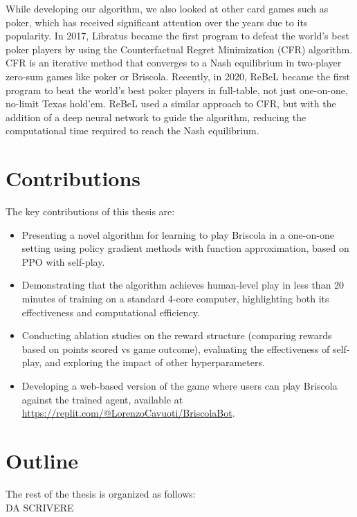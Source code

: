 While developing our algorithm, we also looked at other card games such as poker, which has received significant attention over the years due to its popularity. In 2017, Libratus \cite{libratus} became the first program to defeat the world's best poker players by using the Counterfactual Regret Minimization (CFR) \cite{cfr} algorithm. CFR is an iterative method that converges to a Nash equilibrium in two-player zero-sum games like poker or Briscola. Recently, in 2020, ReBeL \cite{rebel} became the first program to beat the world's best poker players in full-table, not just one-on-one, no-limit Texas hold'em. ReBeL used a similar approach to CFR, but with the addition of a deep neural network to guide the algorithm, reducing the computational time required to reach the Nash equilibrium.

\section{Contributions}
The key contributions of this thesis are:
\begin{itemize}
    \item Presenting a novel algorithm for learning to play Briscola in a one-on-one setting using policy gradient methods with function approximation, based on PPO with self-play.
    \item Demonstrating that the algorithm achieves human-level play in less than 20 minutes of training on a standard 4-core computer, highlighting both its effectiveness and computational efficiency.
    \item Conducting ablation studies on the reward structure (comparing rewards based on points scored vs game outcome), evaluating the effectiveness of self-play, and exploring the impact of other hyperparameters.
    \item Developing a web-based version of the game where users can play Briscola against the trained agent, available at \url{https://replit.com/@LorenzoCavuoti/BriscolaBot}.
\end{itemize}

\section{Outline}
The rest of the thesis is organized as follows:\\
DA SCRIVERE